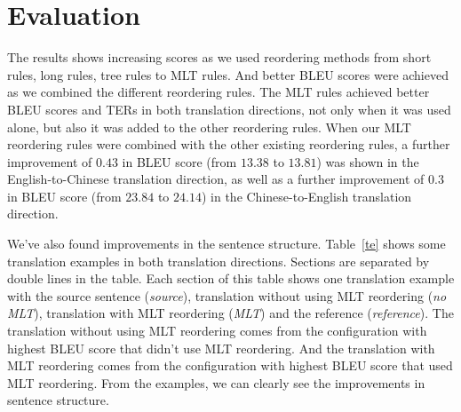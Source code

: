 \section{Evaluation}
\label{ch:Evaluation:sec:Evaluation}

The results shows increasing scores as we used reordering methods from short rules, long rules, tree rules to \ac{MLT} rules. And better \ac{BLEU} scores were achieved as we combined the different reordering rules. The \ac{MLT} rules achieved better \ac{BLEU} scores and \ac{TER}s in both translation directions, not only when it was used alone, but also it was added to the other reordering rules. When our \ac{MLT} reordering rules were combined with the other existing reordering rules, a further improvement of $0.43$ in \ac{BLEU} score (from $13.38$ to $13.81$) was shown in the English-to-Chinese translation direction, as well as a further improvement of $0.3$ in \ac{BLEU} score (from $23.84$ to $24.14$) in the Chinese-to-English translation direction.

We've also found improvements in the sentence structure. Table~\ref{te} shows some translation examples in both translation directions. Sections are separated by double lines in the table. Each section of this table shows one translation example with the source sentence (\emph{source}), translation without using MLT reordering (\emph{no MLT}), translation with MLT reordering (\emph{MLT}) and the reference (\emph{reference}). The translation without using \ac{MLT} reordering comes from the configuration with highest \ac{BLEU} score that didn't use \ac{MLT} reordering. And the translation with \ac{MLT} reordering comes from the configuration with highest \ac{BLEU} score that used \ac{MLT} reordering. From the examples, we can clearly see the improvements in sentence structure.


